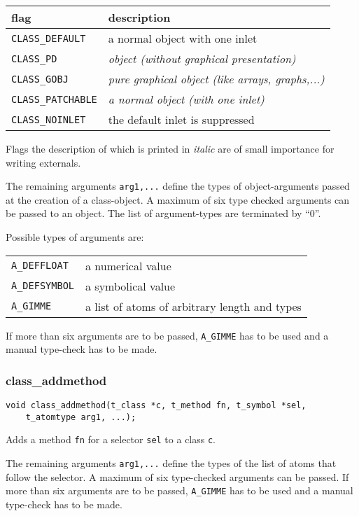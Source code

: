 \documentclass[12pt, a4paper,english,titlepage]{article}
\begin{document}
\begin{appendix}
\begin{tabular}{l|l}
flag&description\\
\hline
\verb+CLASS_DEFAULT+ & a normal object with one inlet \\
\verb+CLASS_PD+ & \em object (without graphical presentation) \\
\verb+CLASS_GOBJ+ & \em pure graphical object (like arrays, graphs,...)\\
\verb+CLASS_PATCHABLE+ & \em a normal object (with one inlet) \\
\verb+CLASS_NOINLET+ & the default inlet is suppressed \\
\end{tabular}

Flags the description of which is printed in {\em italic}
are of small importance for writing externals.

The remaining arguments \verb+arg1,...+ define the
types of object-arguments passed at the creation of a class-object.
A maximum of six type checked arguments can be passed to an object.
The list of argument-types are terminated by ``0''.

Possible types of arguments are:

\begin{tabular}{l|l}
\verb+A_DEFFLOAT+ & a numerical value \\
\verb+A_DEFSYMBOL+ & a symbolical value \\
\verb+A_GIMME+ & a list of atoms of arbitrary length and types \\
\end{tabular}

If more than six arguments are to be passed,
\verb+A_GIMME+ has to be used and a manual type-check has to be made.

\subsubsection{class\_addmethod}
\begin{verbatim}
void class_addmethod(t_class *c, t_method fn, t_symbol *sel,
    t_atomtype arg1, ...);
\end{verbatim}
Adds a method \verb+fn+ for a selector \verb+sel+ to a class \verb+c+.

The remaining arguments \verb+arg1,...+ define the
types of the list of atoms that follow the selector.
A maximum of six type-checked arguments can be passed.
If more than six arguments are to be passed,
\verb+A_GIMME+ has to be used and a manual type-check has to be made.


\end{appendix}
\end{document}
